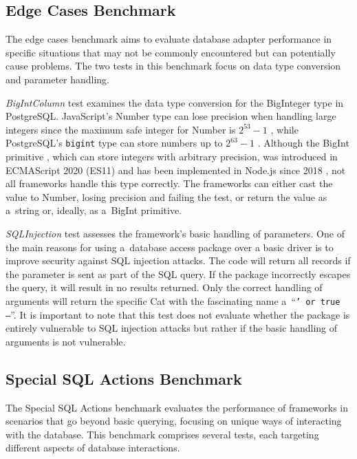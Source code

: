 \subsection*{Edge Cases Benchmark}

The edge cases benchmark aims to evaluate database adapter performance in
specific situations that may not be commonly encountered but can potentially
cause problems. The two tests in this benchmark focus on data type conversion
and parameter handling.

\textit{BigIntColumn} test examines the data type conversion for the BigInteger
type in PostgreSQL. JavaScript's Number type can lose precision when handling
large integers since the maximum safe integer for Number is \(2^{53} - 1\)
\cite{MDNNumber}, while PostgreSQL's \texttt{bigint} type can store numbers up
to \(2^{63} - 1\) \cite{PostgresNumeric}. Although the BigInt primitive
\cite{MDNBigInt}, which can store integers with arbitrary precision, was
introduced in ECMAScript 2020 (ES11) \cite{ecma-262} and has been implemented in
Node.js since 2018 \cite{MDNBigInt}, not all frameworks handle this type
correctly. The frameworks can either cast the value to Number, losing precision
and failing the test, or return the value as a~string or, ideally, as a~BigInt
primitive.

\textit{SQLInjection} test assesses the framework's basic handling of
parameters. One of the main reasons for using a~database access package over a
basic driver is to improve security against SQL injection attacks. The code will
return all records if the parameter is sent as part of the SQL query. If the
package incorrectly escapes the query, it will result in no results returned.
Only the correct handling of arguments will return the specific Cat with the
fascinating name a~\enquote{\texttt{' or true --}}. It is important to note that
this test does not evaluate whether the package is entirely vulnerable to SQL
injection attacks but rather if the basic handling of arguments is not
vulnerable.


\subsection*{Special SQL Actions Benchmark}

The Special SQL Actions benchmark evaluates the performance of frameworks in
scenarios that go beyond basic querying, focusing on unique ways of interacting
with the database. This benchmark comprises several tests, each targeting
different aspects of database interactions.

